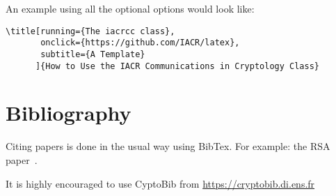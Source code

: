 \documentclass{iacrcc}
\begin{document}
An example using all the optional options would look like:

\begin{verbatim}
\title[running={The iacrcc class},
       onclick={https://github.com/IACR/latex},
       subtitle={A Template}
      ]{How to Use the IACR Communications in Cryptology Class}
\end{verbatim}

\section{Bibliography}
Citing papers is done in the usual way using BibTex. 
For example: the RSA paper~\cite{RSA78}.

It is highly encouraged to use CyptoBib from \url{https://cryptobib.di.ens.fr}




\end{document}
